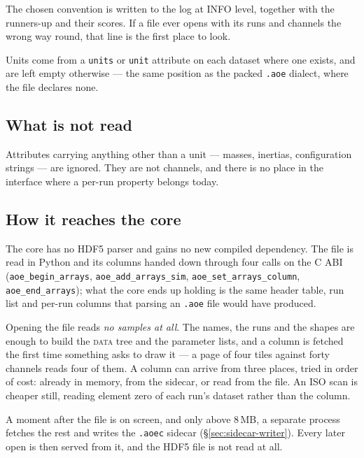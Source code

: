 \documentclass[11pt,a4paper,oneside]{report}
\newcommand{\code}[1]{\texttt{#1}}
\newcommand{\tab}[1]{\textsc{#1}}
\begin{document}
\begin{aoenote}
The chosen convention is written to the log at INFO level, together with the
runners-up and their scores. If a file ever opens with its runs and channels
the wrong way round, that line is the first place to look.
\end{aoenote}

Units come from a \code{units} or \code{unit} attribute on each dataset where
one exists, and are left empty otherwise --- the same position as the packed
\code{.aoe} dialect, where the file declares none.

\subsection*{What is not read}

Attributes carrying anything other than a unit --- masses, inertias,
configuration strings --- are ignored. They are not channels, and there is no
place in the interface where a per-run property belongs today.

\subsection*{How it reaches the core}

The core has no HDF5 parser and gains no new compiled dependency. The file is
read in Python and its columns handed down through four calls on the C ABI
(\code{aoe\_begin\_arrays}, \code{aoe\_add\_arrays\_sim},
\code{aoe\_set\_arrays\_column}, \code{aoe\_end\_arrays}); what the core ends up
holding is the same header table, run list and per-run columns that parsing an
\code{.aoe} file would have produced.

Opening the file reads \emph{no samples at all}. The names, the runs and the
shapes are enough to build the \tab{data} tree and the parameter lists, and a
column is fetched the first time something asks to draw it --- a page of four
tiles against forty channels reads four of them. A column can arrive from three
places, tried in order of cost: already in memory, from the sidecar, or read
from the file. An ISO scan is cheaper still, reading element zero of each run's
dataset rather than the column.

A moment after the file is on screen, and only above 8\,MB, a separate process
fetches the rest and writes the \code{.aoec} sidecar
(\S\ref{sec:sidecar-writer}). Every later open is then served from it, and the
HDF5 file is not read at all.
\end{document}
